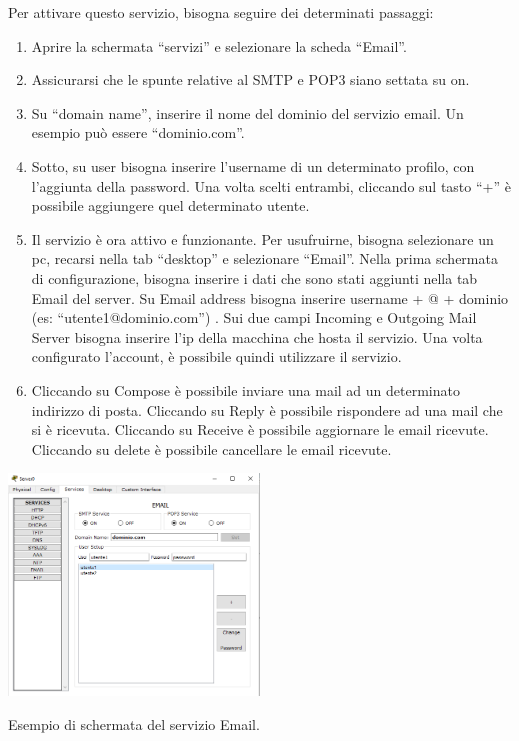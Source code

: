 Per attivare questo servizio, bisogna seguire dei determinati passaggi:

\begin{enumerate}
    \item Aprire la schermata “servizi” e selezionare la scheda “Email”.
    \item Assicurarsi che le spunte relative al SMTP e POP3 siano settata su on.
    \item Su “domain name”, inserire il nome del dominio del servizio email. Un esempio può essere “dominio.com”.
    \item Sotto, su user bisogna inserire l’username di un determinato profilo, con l’aggiunta della password. Una volta scelti entrambi, cliccando sul tasto “+” è possibile aggiungere quel determinato utente.
    \item Il servizio è ora attivo e funzionante. Per usufruirne, bisogna selezionare un pc, recarsi nella tab “desktop” e selezionare “Email”. Nella prima schermata di configurazione, bisogna inserire i dati che sono stati aggiunti nella tab Email del server. Su Email address bisogna inserire username + @ + dominio (es: “utente1@dominio.com”) . Sui due campi Incoming e Outgoing Mail Server bisogna inserire l’ip della macchina che hosta il servizio. Una volta configurato l’account, è possibile quindi utilizzare il servizio.
    \item Cliccando su Compose è possibile inviare una mail ad un determinato indirizzo di posta. Cliccando su Reply è possibile rispondere ad una mail che si è ricevuta. Cliccando su Receive è possibile aggiornare le email ricevute. Cliccando su delete è possibile cancellare le email ricevute.
\end{enumerate}

\begin{sfigure}
    \centering
    \captionsetup{type=figure}
    \includegraphics[width=0.5\textwidth]{images/06.servizi-rete/email/01.conf-server.png}
    \caption{Esempio di schermata del servizio Email.}
    \label{fig:email-conf-server}
\end{sfigure}

